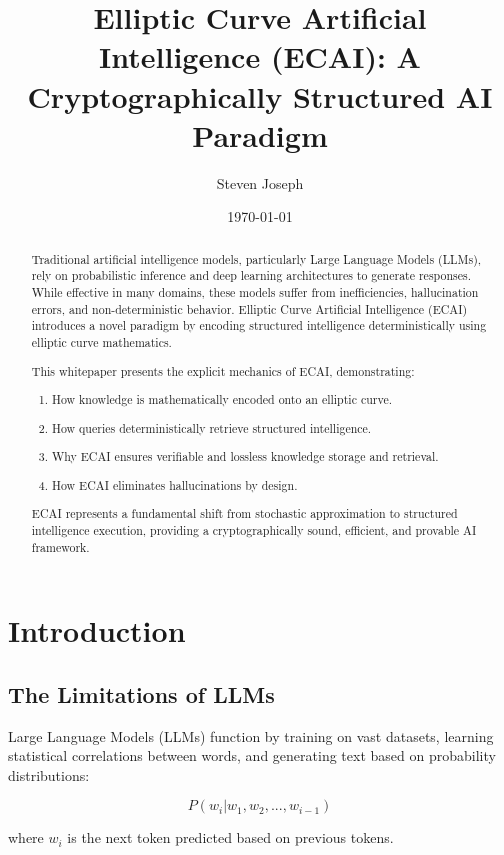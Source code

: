 \documentclass{article}
\title{Elliptic Curve Artificial Intelligence (ECAI): A Cryptographically Structured AI Paradigm}
\author{Steven Joseph}
\date{\today}
\begin{document}
\maketitle

\begin{abstract}
Traditional artificial intelligence models, particularly Large Language Models (LLMs), rely on probabilistic inference and deep learning architectures to generate responses. While effective in many domains, these models suffer from inefficiencies, hallucination errors, and non-deterministic behavior. Elliptic Curve Artificial Intelligence (ECAI) introduces a novel paradigm by encoding structured intelligence deterministically using elliptic curve mathematics.

This whitepaper presents the explicit mechanics of ECAI, demonstrating:
\begin{enumerate}
    \item How knowledge is mathematically encoded onto an elliptic curve.
    \item How queries deterministically retrieve structured intelligence.
    \item Why ECAI ensures verifiable and lossless knowledge storage and retrieval.
    \item How ECAI eliminates hallucinations by design.
\end{enumerate}

ECAI represents a fundamental shift from stochastic approximation to structured intelligence execution, providing a cryptographically sound, efficient, and provable AI framework.
\end{abstract}

\section{Introduction}

\subsection{The Limitations of LLMs}

Large Language Models (LLMs) function by training on vast datasets, learning statistical correlations between words, and generating text based on probability distributions:

\begin{equation}
P(w_i | w_1, w_2, ..., w_{i-1})
\end{equation}

where $w_i$ is the next token predicted based on previous tokens.
\end{document}
